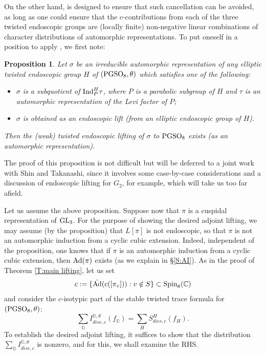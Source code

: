 \documentclass[11pt]{amsart}
\theoremstyle{plain}
\newtheorem{prop}[equation]{Proposition}
\numberwithin{equation}{section}
\newcommand{\C}{\mathbb C}
\def\PGSO{{\rm PGSO}}
\def\Spin{{\rm Spin}}
\def\Spin{{\rm Spin}}
\def\GL{{\rm GL}}
\def\C{{\bf C}}
\def\C{{\mathbb C}}
\begin{document}
 On the other hand,  \cite[Prop. 3.5.1]{A}  is designed to ensure that such cancellation can be avoided, as long as one could ensure that the $c$-contributions from each of the three twisted endoscopic groups are  (locally finite) non-negative linear combinations of character distributions  of automorphic representations.  To put oneself in a position to apply \cite[Prop. 3.5.1]{A}, we first note:
 \vskip 5pt
 
 \begin{prop} \label{P:shin-takanashi}
 Let $\sigma$ be an  irreducible automorphic representation of any elliptic twisted endoscopic group $H$ of $(\PGSO_8, \theta)$ which satisfies one of the following:
 \vskip 5pt
 \begin{itemize}
 \item $\sigma$ is a subquotient of ${\rm Ind}_P^H \tau$, where $P$ is a parabolic subgroup of $H$ and $\tau$ is an automorphic representation of the Levi factor of $P$;
 \vskip 5pt
 
 \item $\sigma$ is obtained as an endoscopic lift (from an elliptic endoscopic group of $H$).
 \end{itemize}
 Then the (weak) twisted endoscopic lifting of $\sigma$ to $\PGSO_8$ exists (as an automorphic representation). 
  \end{prop}
The proof of this proposition is not difficult but will be deferred to a joint work with Shin and Takanashi, since it involves some  case-by-case considerations and a discussion of endoscopic lifting for $G_2$, for example, which will take us too far afield.
\vskip 5pt

Let us assume the above proposition. Suppose now that $\pi$ is a cuspidal representation of $\GL_3$. 
For the purpose of showing the desired adjoint lifting,  we may assume (by the proposition) that 
$L[\pi]$ is not endoscopic, so that $\pi$ is not an automorphic induction from a cyclic cubic extension. Indeed, independent of the proposition, one knows that if $\pi$ is an automorphic induction from a cyclic cubic extension, then ${\rm Ad}(\pi)$ exists (as we explain in \S \ref{S:AI}). As in the proof of Theorem \ref{T:main lifting}, let us set
\[    c := \{   \tilde{\rm Ad} ( c([\pi_v])): v \notin S \}  \subset \Spin_8(\C) \]
and consider the $c$-isotypic part of the stable twisted trace formula for $(\PGSO_8,\theta)$:
\[   \sum_{\mathbb{O}} I^{\mathbb{O}, \theta}_{disc,c} (f_{\mathbb{O}}) = \sum_H  S^H_{dics,c}(f_H). \]
To establish the desired adjoint lifting, it suffices to show that the distribution $\sum_{\mathbb{O}} I^{\mathbb{O}, \theta}_{disc,c}$ is nonzero, and for this, we shall examine the RHS.
\vskip 5pt
\end{document}
